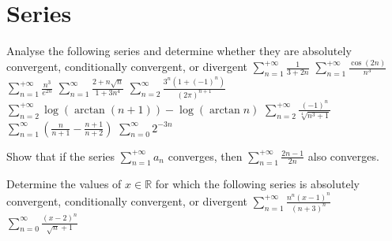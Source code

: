 \documentclass[12pt]{article}
\begin{document}
\section{Series}
\begin{ExerciseList}
	\Exercise Analyse the following series and determine whether they are absolutely convergent, conditionally convergent, or divergent
	\Question $\sum_{n=1}^{+\infty} \frac{1}{3+2n}$
	\Question $\sum_{n=1}^{+\infty} \frac{\cos(2n)}{n^3}$
	\Question $\sum_{n=1}^{+\infty} \frac{n^3}{e^{2n}}$
	\Question $\sum_{n=1}^{\infty}  \frac{2+n\sqrt{n}}{1+3n^4}$
	\Question $\sum_{n=2}^{\infty}  \frac{3^n(1+(-1)^n)}{(2\pi)^{n+1}}$
	\Question $\sum_{n=2}^{+\infty} \log(\arctan(n+1))-\log(\arctan n)$
	\Question $\sum_{n=2}^{+\infty} \frac{(-1)^n}{\sqrt[4]{n^3 + 1}}$
	\Question $\sum_{n=1}^{\infty}  (\frac{n}{n+1} - \frac{n+1}{n+2})$
	\Question $\sum_{n=0}^{\infty}  2^{-3n}$

	\Exercise Show that if the series $\sum_{n=1}^{+\infty}a_n$ converges, then
	$\sum_{n=1}^{+\infty}\frac{2n-1}{2n}$ also converges.

	\Exercise Determine the values of $x\in\mathbb R$ for which the following series
	is absolutely convergent, conditionally convergent, or divergent
	\Question $\sum_{n=1}^{+\infty}\frac{n^n(x-1)^n}{(n+3)^n}$
	\Question $\sum_{n=0}^{\infty}\frac{(x-2)^n}{\sqrt{n}+1}$
\end{ExerciseList}
\end{document}

